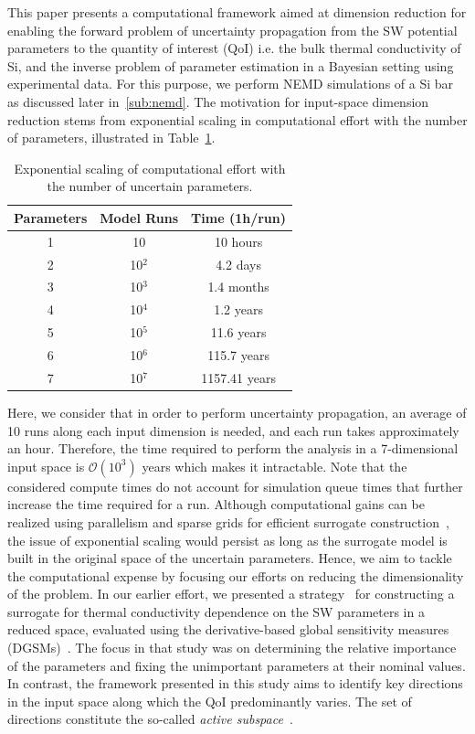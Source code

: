 This paper presents a computational framework aimed at dimension reduction
for enabling the forward problem of uncertainty propagation from the SW potential 
parameters to the quantity of interest (QoI) i.e. the bulk thermal conductivity of Si,
and the inverse problem of parameter estimation in a Bayesian setting using 
experimental data. For this purpose, we perform NEMD simulations of a Si bar
as discussed later in~\ref{sub:nemd}. The
motivation for input-space dimension reduction stems from exponential scaling in
computational effort with the number of parameters, illustrated in Table~\ref{tab:effort}. 
%
\newcommand{\ra}[1]{\renewcommand{\arraystretch}{#1}}
\begin{table}[htbp]
\centering
\ra{1.3}
\begin{tabular}{@{}ccc@{}}\toprule
Parameters & Model Runs & Time (1h/run)\\
\bottomrule
1 & 10 & 10 hours \\
2 & 10$^2$ & 4.2 days \\
3 & 10$^3$ & 1.4 months \\
4 & 10$^4$ & 1.2 years \\
5 & 10$^5$ & 11.6 years \\
6 & 10$^6$ & 115.7 years \\
7 & 10$^7$ & 1157.41 years \\
\bottomrule
\end{tabular}
\caption{Exponential scaling of computational effort with the number of uncertain parameters.}
\label{tab:effort}
\end{table}
%
Here, we consider that in order to perform uncertainty propagation,
an average of 10 runs along each input dimension
is needed, and each run takes approximately an hour. Therefore, the time required to 
perform the analysis in a 7-dimensional input space is $\mathcal{O}(10^3)$ years which makes it
intractable. Note that the considered compute times do not account for simulation queue times that further 
increase the time required for a run. 
Although computational gains can be realized using parallelism and sparse grids
for efficient surrogate construction~\cite{Bichon:2008,Ma:2009,Constantine:2012,Petvipusit:2014,Vohra:2014,Hu:2016}, 
the issue of exponential scaling would persist as long as the surrogate model is built in the original space of
the uncertain parameters.  
Hence, we aim to tackle the computational expense by focusing our efforts on reducing the 
dimensionality of the problem.
In our earlier effort, we presented a strategy~\cite{Vohra:2018b}
for constructing a surrogate for thermal conductivity dependence on the SW parameters
in a reduced space, evaluated using the derivative-based global sensitivity measures
(DGSMs)~\cite{Vohra:2018a}. The focus in that study was on determining the relative importance of the
parameters and fixing the unimportant parameters at their nominal values. In contrast, the
framework presented in this study aims to identify key directions in the input space along which the
QoI predominantly varies. The set of directions constitute the so-called 
\textit{active subspace}~\cite{Constantine:2015}.  

